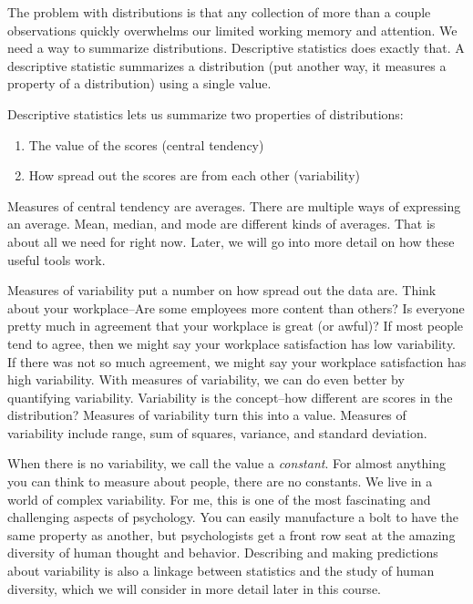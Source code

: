 \documentclass[
]{book}
\providecommand{\tightlist}{%
  \setlength{\itemsep}{0pt}\setlength{\parskip}{0pt}}
\begin{document}
The problem with distributions is that any collection of more than a couple observations quickly overwhelms our limited working memory and attention. We need a way to summarize distributions. Descriptive statistics does exactly that. A descriptive statistic summarizes a distribution (put another way, it measures a property of a distribution) using a single value.

Descriptive statistics lets us summarize two properties of distributions:

\begin{enumerate}
\def\labelenumi{\arabic{enumi}.}
\tightlist
\item
  The value of the scores (central tendency)
\item
  How spread out the scores are from each other (variability)
\end{enumerate}

Measures of central tendency are averages. There are multiple ways of expressing an average. Mean, median, and mode are different kinds of averages. That is about all we need for right now. Later, we will go into more detail on how these useful tools work.

Measures of variability put a number on how spread out the data are. Think about your workplace--Are some employees more content than others? Is everyone pretty much in agreement that your workplace is great (or awful)? If most people tend to agree, then we might say your workplace satisfaction has low variability. If there was not so much agreement, we might say your workplace satisfaction has high variability. With measures of variability, we can do even better by quantifying variability. Variability is the concept--how different are scores in the distribution? Measures of variability turn this into a value. Measures of variability include range, sum of squares, variance, and standard deviation.

When there is no variability, we call the value a \emph{constant}. For almost anything you can think to measure about people, there are no constants. We live in a world of complex variability. For me, this is one of the most fascinating and challenging aspects of psychology. You can easily manufacture a bolt to have the same property as another, but psychologists get a front row seat at the amazing diversity of human thought and behavior. Describing and making predictions about variability is also a linkage between statistics and the study of human diversity, which we will consider in more detail later in this course.
\end{document}
